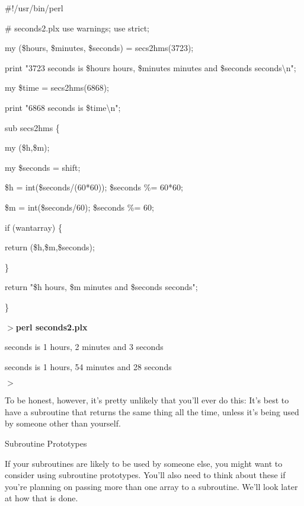 \documentclass[a4paper,11pt]{book}
\begin{document}
\noindent 

\noindent \#!/usr/bin/perl

\noindent \# seconds2.plx use warnings; use strict;

\noindent my (\$hours, \$minutes, \$seconds) = secs2hms(3723);

\noindent print "3723 seconds is \$hours hours, \$minutes minutes and \$seconds seconds\textbackslash n";

\noindent my \$time = secs2hms(6868);

\noindent print "6868 seconds is \$time\textbackslash n";

\noindent 

\noindent sub secs2hms \{

\noindent my (\$h,\$m);

\noindent my \$seconds = shift;

\noindent \$h = int(\$seconds/(60*60)); \$seconds \%= 60*60;

\noindent \$m = int(\$seconds/60); \$seconds \%= 60;

\noindent if (wantarray) \{

\noindent return (\$h,\$m,\$seconds);

\noindent \}

\noindent return "\$h hours, \$m minutes and \$seconds seconds";

\noindent \}

\noindent 

\noindent 

\noindent $>$\textbf{perl seconds2.plx}

 seconds is 1 hours, 2 minutes and 3 seconds

 seconds is 1 hours, 54 minutes and 28 seconds

\noindent $>$

\noindent 

\noindent To be honest, however, it's pretty unlikely that you'll ever do this: It's best to have a subroutine that returns the same thing all the time, unless it's being used by someone other than yourself.

\noindent 

\noindent Subroutine Prototypes

\noindent 

\noindent If your subroutines are likely to be used by someone else, you might want to consider using subroutine prototypes. You'll also need to think about these if you're planning on passing more than one array to a subroutine. We'll look later at how that is done.
\end{document}
